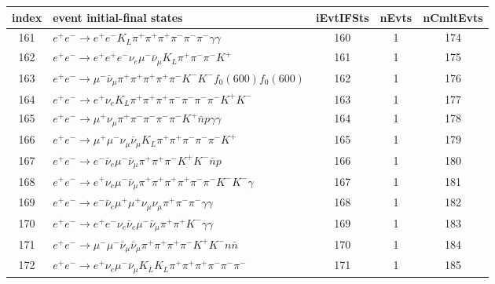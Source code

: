 \documentclass[landscape]{article}
\begin{document}
\clearpage

\begin{table}[htbp!]
\small
\centering
\begin{tabular}{|c|>{\centering}p{18cm}|c|c|c|}
\hline
index & event initial-final states & iEvtIFSts & nEvts & nCmltEvts \\
\hline
161 & $ e^{+} e^{-} \rightarrow e^{+} e^{-} K_{L} \pi^{+} \pi^{+} \pi^{+} \pi^{-} \pi^{-} \pi^{-} \gamma \gamma $ & 160 & 1 & 174 \\
\hline
162 & $ e^{+} e^{-} \rightarrow e^{+} e^{+} e^{-} \nu_{e} \mu^{-} \bar{\nu}_{\mu} K_{L} \pi^{+} \pi^{-} \pi^{-} K^{+} $ & 161 & 1 & 175 \\
\hline
163 & $ e^{+} e^{-} \rightarrow \mu^{-} \bar{\nu}_{\mu} \pi^{+} \pi^{+} \pi^{+} \pi^{+} \pi^{-} K^{-} K^{-} f_{0}(600) f_{0}(600) $ & 162 & 1 & 176 \\
\hline
164 & $ e^{+} e^{-} \rightarrow e^{+} \nu_{e} K_{L} \pi^{+} \pi^{+} \pi^{+} \pi^{-} \pi^{-} \pi^{-} \pi^{-} K^{+} K^{-} $ & 163 & 1 & 177 \\
\hline
165 & $ e^{+} e^{-} \rightarrow \mu^{+} \nu_{\mu} \pi^{+} \pi^{-} \pi^{-} \pi^{-} \pi^{-} K^{+} \bar{n} p \gamma \gamma $ & 164 & 1 & 178 \\
\hline
166 & $ e^{+} e^{-} \rightarrow \mu^{+} \mu^{-} \nu_{\mu} \bar{\nu}_{\mu} K_{L} \pi^{+} \pi^{+} \pi^{-} \pi^{-} \pi^{-} K^{+} $ & 165 & 1 & 179 \\
\hline
167 & $ e^{+} e^{-} \rightarrow e^{-} \bar{\nu}_{e} \mu^{-} \bar{\nu}_{\mu} \pi^{+} \pi^{+} \pi^{-} K^{+} K^{-} \bar{n} p $ & 166 & 1 & 180 \\
\hline
168 & $ e^{+} e^{-} \rightarrow e^{+} \nu_{e} \mu^{-} \bar{\nu}_{\mu} \pi^{+} \pi^{+} \pi^{+} \pi^{+} \pi^{-} \pi^{-} K^{-} K^{-} \gamma $ & 167 & 1 & 181 \\
\hline
169 & $ e^{+} e^{-} \rightarrow e^{-} \bar{\nu}_{e} \mu^{+} \mu^{+} \nu_{\mu} \nu_{\mu} \pi^{+} \pi^{-} \pi^{-} \gamma \gamma $ & 168 & 1 & 182 \\
\hline
170 & $ e^{+} e^{-} \rightarrow e^{+} e^{-} \nu_{e} \bar{\nu}_{e} \mu^{-} \bar{\nu}_{\mu} \pi^{+} \pi^{+} K^{-} \gamma \gamma $ & 169 & 1 & 183 \\
\hline
171 & $ e^{+} e^{-} \rightarrow \mu^{-} \mu^{-} \bar{\nu}_{\mu} \bar{\nu}_{\mu} \pi^{+} \pi^{+} \pi^{+} \pi^{-} K^{+} K^{-} n \bar{n} $ & 170 & 1 & 184 \\
\hline
172 & $ e^{+} e^{-} \rightarrow e^{+} \nu_{e} \mu^{-} \bar{\nu}_{\mu} K_{L} K_{L} \pi^{+} \pi^{+} \pi^{+} \pi^{-} \pi^{-} \pi^{-} $ & 171 & 1 & 185 \\

\end{tabular}
\end{table}
\end{document}
